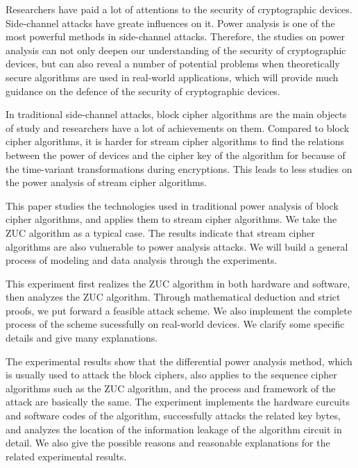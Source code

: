 \begin{englishabstract}
Researchers have paid a lot of attentions to the security of cryptographic devices. Side-channel attacks have greate influences on it. Power analysis is one of the most powerful methods in side-channel attacks. Therefore, the studies on power analysis can not only deepen our understanding of the security of cryptographic devices, but can also reveal a number of potential problems when theoretically secure algorithms are used in real-world applications, which will provide much guidance on the defence of the security of cryptographic devices.

In traditional side-channel attacks, block cipher algorithms are the main objects of study and researchers have a lot of achievements on them. Compared to block cipher algorithms, it is harder for stream cipher algorithms to find the relations between the power of devices and the cipher key of the algorithm for because of the time-variant transformations during encryptions. This leads to less studies on the power analysis of stream cipher algorithms.

This paper studies the technologies used in traditional power analysis of block cipher algorithms, and applies them to stream cipher algorithms. We take the ZUC algorithm as a typical case. The results indicate that stream cipher algorithms are also vulnerable to power analysis attacks. We will build a general process of modeling and data analysis through the experiments.

This experiment first realizes the ZUC algorithm in both hardware and software, then analyzes the ZUC algorithm. Through mathematical deduction and strict proofs, we put forward a feasible attack scheme. We also implement the complete process of the scheme sucessfully on real-world devices. We clarify some specific details and give many explanations.

The experimental results show that the differential power analysis method, which is usually used to attack the block ciphers, also applies to the sequence cipher algorithms such as the ZUC algorithm, and the process and framework of the attack are basically the same. The experiment implements the hardware curcuits and software codes of the algorithm, successfully attacks the related key bytes, and analyzes the location of the information leakage of the algorithm circuit in detail. We also give the possible reasons and reasonable explanations for the related experimental results.

\end{englishabstract}

